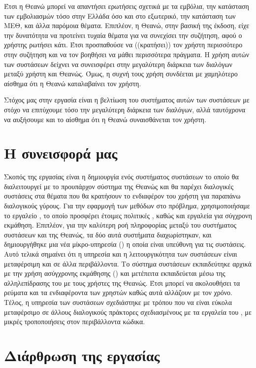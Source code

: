 Έτσι η Θεανώ μπορεί να απαντήσει ερωτήσεις σχετικά με τα εμβόλια, την κατάσταση των εμβολιασμών τόσο στην Ελλάδα όσο και στο εξωτερικό,
την κατάσταση των ΜΕΘ, και άλλα παρόμοια θέματα. Επιπλέον, η Θεανώ, στην βασική της έκδοση, είχε την δυνατότητα να προτείνει τυχαία θέματα για να
συνεχίσει την συζήτηση, αφού ο χρήστης ρωτήσει κάτι. Έτσι προσπαθούσε να ((κρατήσει)) τον χρήστη περισσότερο στην συζήτηση και να τον βοηθήσει
να μάθει περισσότερα πράγματα. Η χρήση αυτών των συστάσεων δείχνει να συνεισφέρει στην μεγαλύτερη διάρκεια των διαλόγων μεταξύ
χρήστη και Θεανώς. Όμως, η συχνή τους χρήση συνδέεται με χαμηλότερο αίσθημα ότι η Θεανώ καταλαβαίνει τον χρήστη.

Στόχος μας στην εργασία είναι η βελτίωση του συστήματος αυτών των συστάσεων με στόχο να επιτύχουμε τόσο την μεγαλύτερη διάρκεια των διαλόγων, αλλά ταυτόχρονα
να αυξήσουμε και το αίσθημα ότι η Θεανώ συναισθάνεται τον χρήστη.

\section{Η συνεισφορά μας}

Σκοπός της εργασίας είναι η δημιουργία ενός συστήματος συστάσεων το οποίο θα διαλειτουργεί με το προυπάρχον σύστημα της Θεανώς και θα παρέχει διαλογικές
συστάσεις στα θέματα που θα κρατήσουν το ενδιαφέρον του χρήστη για παραπάνω διαλογικούς γύρους.
Για την εφαρμογή των μεθόδων  στο πρόβλημα, χρησιμοποιήσαμε το εργαλείο , το οποίο προσφέρει έτοιμες πολιτικές ,
καθώς και εργαλεία για σύγχρονη εκμάθηση. Επιπλέον, για την καλύτερη ροή πληροφορίας μεταξύ του συστήματος συστάσεων και της Θεανώς, τα δύο αυτά συστήματα
διαχωρίστηκαν, και δημιουργήθηκε μια νέα μίκρο-υπηρεσία () η οποία είναι υπεύθυνη για τις συστάσεις. Αυτό τελικά σημαίνει ότι η υπηρεσία
και η λειτουργικότητα των συστάσεων είναι μεταφέρσιμη και σε άλλα περιβάλλοντα.
Το σύστημα συστάσεων εκπαιδεύτηκε αρχικά με την χρήση ασύγχρονης εκμάθησης () και μετέπειτα εκπαιδεύεται μέσω της αλληλεπίδρασης του
με τους χρήστες της Θεανώς. Έτσι μπορεί να ακολουθήσει τα ρεύματα και τα ενδιαφέροντα των χρηστών καθώς αυτά αλλάζουν με τον χρόνο.
Τέλος, η υπηρεσία των συστάσεων σχεδιάστηκε με τρόπου που να είναι εύκολα μεταφέρσιμο σε άλλους διαλογικούς πράκτορες σχεδιασμένους με τα εργαλεία του
, με μικρές τροποποιήσεις στον περιβάλλοντα κώδικα.

\section{Διάρθρωση της εργασίας}

